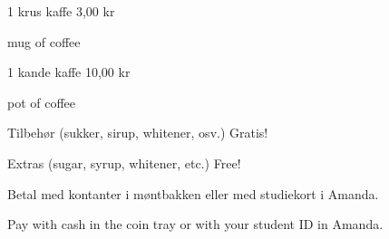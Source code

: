 \documentclass{article}
\begin{document}
1 krus kaffe \hfill 3,00 kr

{ mug of coffee}

\vspace{0.3cm}

1 kande kaffe \hfill 10,00 kr

{ pot of coffee}

\vspace{0.3cm}

Tilbehør {\large (sukker, sirup, whitener, osv.)}
\hfill Gratis!

{\english Extras \large (sugar, syrup, whitener, etc.)}
\hfill  {\english Free!}

\vspace{0.5cm}

\begin{center}
\Large\bf

Betal med kontanter i møntbakken eller med studiekort i Amanda.

{\english Pay with cash in the coin tray or with your student ID in Amanda.}

\end{center}

\underskriv
\end{document}
